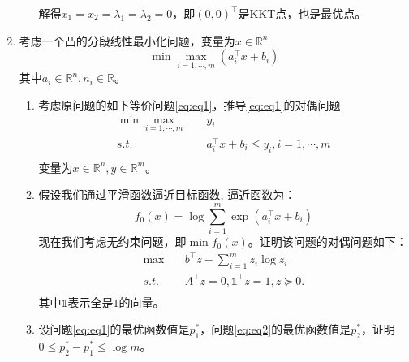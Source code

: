 \documentclass[cn,hazy,cyan,11pt,normal]{elegantnote}
\begin{document}
\begin{enumerate}
\begin{enumerate}
                    \vspace{0.2cm}解得$x_1=x_2=\lambda_1=\lambda_2=0$，即$(0,0)^{\top}$是KKT点，也是最优点。
            \end{enumerate}

        \item {\color{c1}\vspace{0.5cm}考虑一个凸的分段线性最小化问题，变量为$x\in\mathbb{R}^n$
            \[\min\max_{i=1,\cdots,m}(a^{\top}_i x+b_i)\]
            其中$a_i\in\mathbb{R}^n,n_i\in\mathbb{R}$。

            \begin{enumerate}
                \item 考虑原问题的如下等价问题\ref{eq:eq1}，推导\ref{eq:eq1}的对偶问题
                    \begin{equation}
                        \begin{aligned}
                        \min\max_{i=1,\cdots,m}\quad& y_i\\
                        s.t.\quad& a^{\top}_i x+b_i\leq y_i,i=1,\cdots,m\\
                        \end{aligned}
                        \tag{2.1}
                        \label{eq:eq1}
                    \end{equation}
                    变量为$x\in\mathbb{R}^n,y\in\mathbb{R}^m$。
                \item 假设我们通过平滑函数逼近目标函数, 逼近函数为：
                    \[f_0(x)=\log\sum_{i=1}^m \exp(a_i^{\top}x+b_i)\]
                    现在我们考虑无约束问题，即$\min f_0(x)$。证明该问题的对偶问题如下：
                    \begin{equation}
                        \begin{aligned}
                        \max\quad& b^{\top}z-\sum_{i=1}^m z_i\log z_i\\
                        s.t.\quad& A^{\top}z=0,\mathds{1}^{\top}z=1,z\succeq0.\\
                        \end{aligned}
                        \tag{2.2}
                        \label{eq:eq2}
                    \end{equation}
                    其中$\mathds{1}$表示全是$1$的向量。
                \item 设问题\ref{eq:eq1}的最优函数值是$p_1^*$，问题\ref{eq:eq2}的最优函数值是$p_2^*$，证明$0\leq p_2^*-p_1^*\leq \log m$。
            \end{enumerate}}


\end{enumerate}
\end{document}
